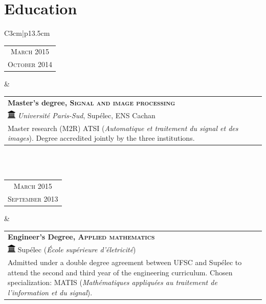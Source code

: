 \section{Education}

\begin{tabular}{C{3cm}|p{13.5cm}}
    \begin{tabular}{c}
        \textsc{March 2015}
        \\
        \textsc{October 2014}
    \end{tabular}
    &
    \begin{tabular}{p{13cm}}
        \textbf{Master's degree, \textsc{Signal and image processing}}
        \\
        \vspace{0.00cm}
        \includegraphics[height=0.4cm]{static/uni-1.png}
        \textit{Université Paris-Sud}, Supélec, ENS Cachan
        \vspace{0.18cm}
        \\
        Master research (M2R) ATSI (\textit{Automatique et traitement du signal et des images}). Degree accredited jointly by the three institutions.
    \end{tabular}
    \\
    \\
    \begin{tabular}{c}
        \textsc{March 2015}
        \\
        \textsc{September 2013}
    \end{tabular}&
    \begin{tabular}{p{13cm}}
        \textbf{Engineer's Degree, \textsc{Applied mathematics}}
        \\
        \vspace{0.00cm}
        \includegraphics[height=0.4cm]{static/uni-1.png}
        Supélec (\textit{École supérieure d'életricité})
        \vspace{0.18cm}
        \\
        Admitted under a double degree agreement between UFSC and Supélec to attend the second and third year of the engineering curriculum. Chosen specialization: MATIS (\textit{Mathématiques appliquées au traitement de l'information et du signal}).
    \end{tabular}

\end{tabular}
